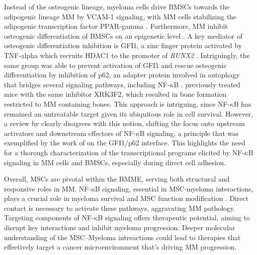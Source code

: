 Instead of the osteogenic lineage, myeloma cells drive \acp{BMSC} towards the
adipogenic lineage \ac{MM} by \ac{VCAM-1} signaling, with MM cells stabilizing
the adipogenic transcription factor \ac{PPAR-gamma}
\cite{dotterweichContactMyelomaCells2016, liuMyelomaCellsShift2020}.
Furthermore, \ac{MM} inhibit osteogenic differentiation of \acp{BMSC} on an
epigenetic level \cite{allegraEpigeneticCrosstalkMalignant2022}. A key mediator
of osteogenic differentiation inhibition is \ac{GFI1}, a zinc finger protein
activated by \ac{TNF-alpha} which recruits \ac{HDAC1} to the promoter of
\textit{RUNX2} \cite{dsouzaGfi1ExpressedBone2011,
    adamikEZH2HDAC1Inhibition2017}. Intriguingly, the same group was able to prevent
activation of \ac{GFI1} and rescue osteogenic differentiation by inhibition of
p62, an adapter protein involved in autophagy that bridges several signaling
pathways, including NF-$\kappa$B \cite{adamikXRK3F2InhibitionP62ZZ2018}.
\citet{teramachiBlockingZZDomain2016} previously treated mice with the same
inhibitor XRK3F2, which resulted in bone formation restricted to MM containing
bones. This approach is intriguing, since NF-$\kappa$B has remained an
untreatable target given its ubiquitous role in cell survival. However, a review
by \citet{verzellaNFkBPharmacopeiaNovel2022} clearly disagrees with this
notion, shifting the focus onto upstream
activators and downstream effectors of NF-$\kappa$B signaling, a principle that
was exemplified by the work of \citet{adamikXRK3F2InhibitionP62ZZ2018} on the
GFI1/p62 interface. This highlights the need for a thorough characterization of
the transcriptional programs elicited by NF-$\kappa$B signaling in \ac{MM} cells
and \acp{BMSC}, especially during direct cell adhesion.








Overall, \acp{MSC} are pivotal within the \ac{BMME}, serving both structural and
responsive roles in \ac{MM}. NF-$\kappa$B signaling, essential in MSC-myeloma
interactions, plays a crucial role in myeloma survival and MSC function
modification \cite{cippitelliRoleNFkBSignaling2023,
    royNFkBActivatingPathways2018}. Direct contact is necessary to activate these
pathways, aggravating \ac{MM} pathology. Targeting components of NF-$\kappa$B
signaling offers therapeutic potential, aiming to disrupt key interactions and
inhibit myeloma progression. Deeper molecular understanding of the MSC--Myeloma
intreactions could lead to therapies that effectively target a cancer
microenvironment that's driving \ac{MM} progression.









